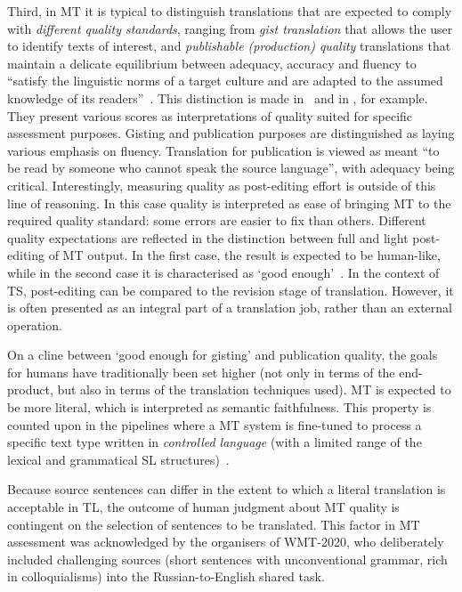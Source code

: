 Third, in MT it is typical to distinguish translations that are expected to comply with \textit{different quality standards}, ranging from \textit{gist translation} that allows the user to identify texts of interest, and \textit{publishable (production) quality} translations that maintain a delicate equilibrium between adequacy, accuracy and fluency to ``satisfy the linguistic norms of a target culture and are adapted to the assumed knowledge of its readers''~\cite[p.21]{Ahrenberg2017}. This distinction is made in~\citet{Scarton2016} and in \citet[p.43]{Specia2018a}, for example. They present various scores as interpretations of quality suited for specific assessment purposes. Gisting and publication purposes are distinguished as laying various emphasis on fluency. Translation for publication is viewed as meant ``to be read by someone who cannot speak the source language'', with adequacy being critical. Interestingly, measuring quality as post-editing effort is outside of this line of reasoning. In this case quality is interpreted as ease of bringing MT to the required quality standard: some errors are easier to fix than others. Different quality expectations are reflected in the distinction between full and light post-editing of MT output. In the first case, the result is expected to be human-like, while in the second case it is characterised as `good enough'~\cite{Massardo2016}.
In the context of TS, post-editing can be compared to the revision stage of translation. However, it is often presented as an integral part of a translation job, rather than an external operation. 

On a cline between `good enough for gisting' and publication quality, the goals for humans have traditionally been set higher (not only in terms of the end-product, but also in terms of the translation techniques used). MT is expected to be more literal, which is interpreted as semantic faithfulness. This property is counted upon in the pipelines where a MT system is fine-tuned to process a specific text type written in \textit{controlled language} (with a limited range of the lexical and grammatical SL structures)~\cite[p.17]{Gil2006}.

Because source sentences can differ in the extent to which a literal translation is acceptable in TL, the outcome of human judgment about MT quality is contingent on the selection of sentences to be translated. This factor in MT assessment was acknowledged by the organisers of WMT-2020, who deliberately included challenging sources (short sentences with unconventional grammar, rich in colloquialisms) into the Russian-to-English shared task.

